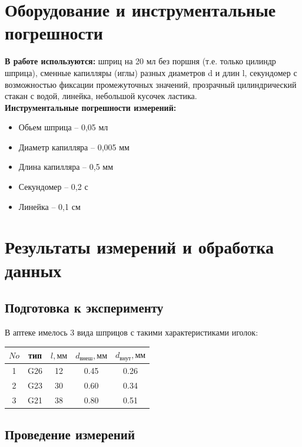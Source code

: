 \section{Оборудование и инструментальные погрешности}

\textbf{В работе используются:} шприц на 20 мл без поршня (т.е. только цилиндр шприца), сменные капилляры (иглы) разных диаметров d и длин l, секундомер с возможностью фиксации промежуточных значений, прозрачный цилиндрический стакан с водой, линейка, небольшой кусочек ластика.\\

\textbf{Инструментальные погрешности измерений:}\\
\begin{itemize}
\item Обьем шприца -- 0,05 мл
\item Диаметр капилляра -- 0,005 мм
\item Длина капилляра -- 0,5 мм
\item Секундомер -- 0,2 с
\item Линейка -- 0,1 см
\end{itemize}

\section{Результаты измерений и обработка данных}

\subsection{Подготовка к эксперименту}
В аптеке имелось 3 вида шприцов с такими характеристиками иголок:
\begin{center}
\begin{tabular}{|c|c|c|c|c|}
\hline
 $  No   $&тип & $  l, мм $ & $d_{внеш}, мм $ & $ d_{внут}, мм$\\
\hline
     1    & G26  &    12  &   0.45  &   0.26     \\
\hline
    2     &    G23 &30    &   0.60  &   0.34     \\
\hline
    3     & G21  & 38     &  0.80   &    0.51   \\
\hline
\end{tabular}
\end{center}

\subsection{Проведение измерений}


